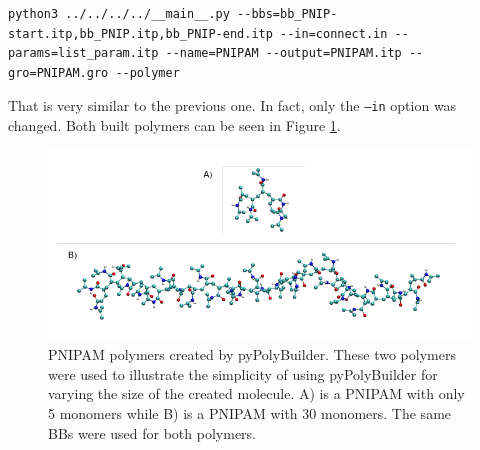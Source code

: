 \begin{lstlisting}
python3 ../../../../__main__.py --bbs=bb_PNIP-start.itp,bb_PNIP.itp,bb_PNIP-end.itp --in=connect.in --params=list_param.itp --name=PNIPAM --output=PNIPAM.itp --gro=PNIPAM.gro --polymer
\end{lstlisting}

That is very similar to the previous one.
In fact, only the \texttt{--in} option was changed.
Both built polymers can be seen in Figure \ref{fig:PNIPAMSIZE}.

\begin{figure}
    \center
    \includegraphics[width=\textwidth]{PNIPAM/PNIPAMSIZE.pdf}
    \caption{PNIPAM polymers created by pyPolyBuilder.
    These two polymers were used to illustrate the simplicity of using pyPolyBuilder for varying the size of the created molecule. A) is a PNIPAM with only 5 monomers while B) is a PNIPAM with 30 monomers.
    The same BBs were used for both polymers.}
    \label{fig:PNIPAMSIZE}
\end{figure}